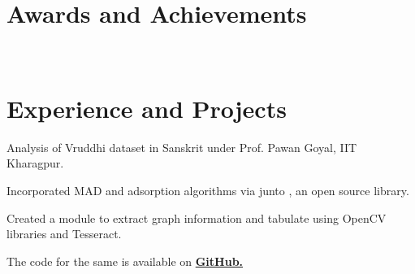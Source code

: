 \documentclass[a4paper]{deedy-resume} %
\begin{document}
\begin{minipage}[t]{0.66\textwidth}

  \section{Awards and Achievements}

\fontsize{11pt}{11pt}\\
\normalfont

  \sectionspace


  \section{Experience and Projects}

  \runsubsection{}
  \vspace{\topsep}
  \begin{tightitemize}
  \item Analysis of Vruddhi dataset in Sanskrit under Prof. Pawan Goyal, IIT Kharagpur.
  \item	Incorporated MAD and adsorption algorithms via junto , an open source library.
  \end{tightitemize}

  \sectionspace

  \runsubsection{}
  \begin{tightitemize}
  \item Created a module to extract graph information and tabulate using OpenCV libraries and Tesseract.
  \item The code for the same is available on \href{https://github.com/Azad-Hall/open-soft-2015-2016}{\bf GitHub.}
  \end{tightitemize}


\end{minipage}
\end{document}
